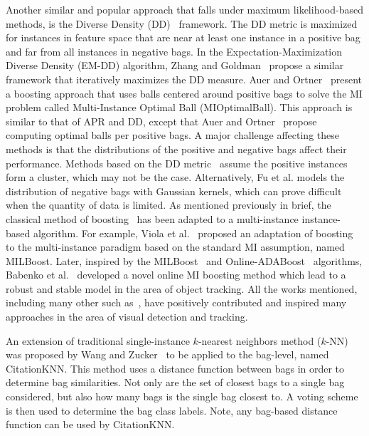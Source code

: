 \documentclass[reqno]{vcuthesis}
\numberwithin{equation}{chapter}
\begin{document}
Another similar and popular approach that falls under maximum likelihood-based methods, is the Diverse Density (DD)~\cite{Maron1998} framework. The DD metric is maximized for instances in feature space that are near at least one instance in a positive bag and far from all instances in negative bags. In the Expectation-Maximization Diverse Density (EM-DD) algorithm, Zhang and Goldman~\cite{Zhang2001} propose a similar framework that iteratively maximizes the DD measure. Auer and Ortner~\cite{Auer2004} present a boosting approach that uses balls centered around positive bags to solve the MI problem called Multi-Instance Optimal Ball (MIOptimalBall). This approach is similar to that of APR and DD, except that Auer and Ortner~\cite{Auer2004} propose computing optimal balls per positive bags. A major challenge affecting these methods is that the distributions of the positive and negative bags affect their performance. Methods based on the DD metric~\cite{Carbonneau2016,Chen2006,Chen2004} assume the positive instances form a cluster, which may not be the case. Alternatively, Fu et al.\cite{Fu2011} models the distribution of negative bags with Gaussian kernels, which can prove difficult when the quantity of data is limited.
\newpage
As mentioned previously in brief, the classical method of boosting~\cite{freund1996experiments,schapire1999improved} has been adapted to a multi-instance instance-based algorithm. For example, Viola et al.~\cite{zhang2006multiple} proposed an adaptation of boosting to the multi-instance paradigm based on the standard MI assumption, named MILBoost. Later, inspired by the MILBoost~\cite{zhang2006multiple} and Online-ADABoost~\cite{oza2001online} algorithms, Babenko et al.~\cite{babenko2009visual} developed a novel online MI boosting method which lead to a robust and stable model in the area of object tracking. All the works mentioned, including many other such as~\cite{qi2011online,xie2012online}, have positively contributed and inspired many approaches in the area of visual detection and tracking.

An extension of traditional single-instance $k$-nearest neighbors method ($k$-NN) was proposed by Wang and Zucker~\cite{Wang2000} to be applied to the bag-level, named CitationKNN. This method uses a distance function between bags in order to determine bag similarities. Not only are the set of closest bags to a single bag  considered, but also how many bags is the single bag closest to. A voting scheme is then used to determine the bag class labels. Note, any bag-based distance function can be used by CitationKNN.
\end{document}
